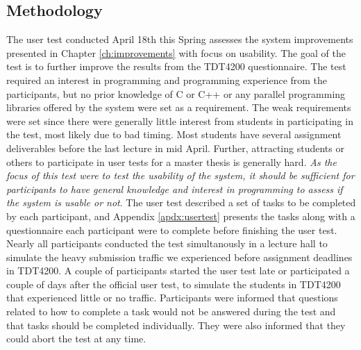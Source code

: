 \subsection{Methodology}
The user test conducted April 18th this Spring assesses the system improvements presented in Chapter \ref{ch:improvements} with focus on usability. The goal of the test is to further improve the results from the TDT4200 questionnaire. The test required an interest in programming and programming experience from the participants, but no prior knowledge of C or C++ or any parallel programming libraries offered by the system were set as a requirement. The weak requirements were set since there were generally little interest from students in participating in the test, most likely due to bad timing. Most students have several assignment deliverables before the last lecture in mid April. Further, attracting students or others to participate in user tests for a master thesis is generally hard. \textit{As the focus of this test were to test the usability of the system, it should be sufficient for participants to have general knowledge and interest in programming to assess if the system is usable or not}. The user test described a set of tasks to be completed by each participant, and Appendix \ref{apdx:usertest} presents the tasks along with a questionnaire each participant were to complete before finishing the user test. Nearly all participants conducted the test simultanously in a lecture hall to simulate the heavy submission traffic we experienced before assignment deadlines in TDT4200. A couple of participants started the user test late or participated a couple of days after the official user test, to simulate the students in TDT4200 that experienced little or no traffic. Participants were informed that questions related to how to complete a task would not be answered during the test and that tasks should be completed individually. They were also informed that they could abort the test at any time. \\

